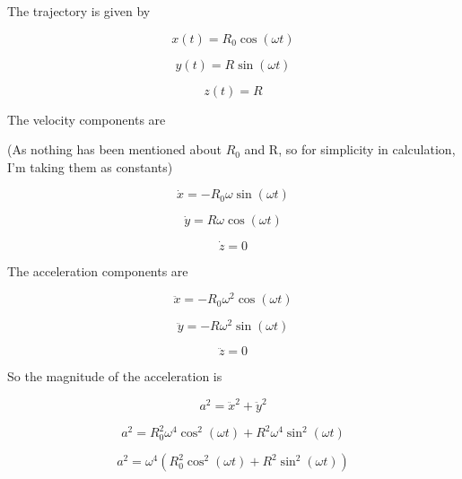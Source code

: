 \documentclass{article}
\begin{document}
The trajectory is given by

\begin{equation}
x(t)=R_0\cos(\omega t)
\end{equation}

\begin{equation}
y(t)=R\sin(\omega t)
\end{equation}

\begin{equation}
z(t)=R
\end{equation}

The velocity components are

(As nothing has been mentioned about $R_0$ and R, so for simplicity in calculation, I'm taking them as constants)

\begin{equation}
\dot{x}=-R_0\omega\sin(\omega t)
\end{equation}

\begin{equation}
\dot{y}=R\omega\cos(\omega t)
\end{equation}

\begin{equation}
\dot{z}=0
\end{equation}

The acceleration components are

\begin{equation}
\ddot{x}=-R_0\omega^2\cos(\omega t)
\end{equation}

\begin{equation}
\ddot{y}=-R\omega^2\sin(\omega t)
\end{equation}

\begin{equation}
\ddot{z}=0
\end{equation}

So the magnitude of the acceleration is

\begin{equation}
a^2=\ddot{x}^2+\ddot{y}^2
\end{equation}

\begin{equation}
a^2=
R_0^2\omega^4\cos^2(\omega t)
+
R^2\omega^4\sin^2(\omega t)
\end{equation}

\begin{equation}
a^2=\omega^4
\left(
R_0^2\cos^2(\omega t)+R^2\sin^2(\omega t)
\right)
\end{equation}
\end{document}
